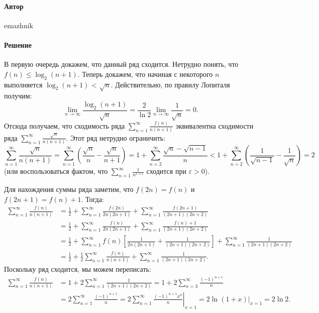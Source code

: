 \documentclass{article}
\begin{document}
\paragraph{Автор} emazhnik
\paragraph{Решение} В первую очередь докажем, что данный ряд сходится. Нетрудно понять, что $f(n) \leq \log_2 (n+1)$.
Теперь докажем, что начиная с некоторого $n$ выполняется $\log_2 (n+1)$ < $\sqrt{n}$. Действительно, по правилу Лопиталя получим:
$$\lim_{n\to \infty} \frac{\log_2 (n+1)}{\sqrt{n}} = \frac{2}{\ln 2} \lim_{n\to \infty} \frac{1}{\sqrt{n}} = 0.$$
Отсюда получаем, что сходимость ряда $\sum\limits_{n=1}^\infty \frac{f(n)}{n(n+1)}$ эквивалентна сходимости ряда $\sum\limits_{n=1}^\infty \frac{\sqrt{n}}{n(n+1)}$.
Этот ряд нетрудно ограничить:
$$\sum_{n=1}^\infty \frac{\sqrt{n}}{n(n+1)} = \sum_{n=1}^\infty \left( \frac{\sqrt{n}}{n} - \frac{\sqrt{n}}{n+1} \right) = 1 + \sum_{n=2}^\infty \frac{\sqrt{n} - \sqrt{n-1}}{n} < 1 + \sum_{n=2}^\infty \left( \frac{1}{\sqrt{n-1}} - \frac{1}{\sqrt{n}} \right) = 2$$
(или воспользоваться фактом, что $\sum_{n=1}^\infty \frac{1}{n^{1+\varepsilon}}$ сходится при $\varepsilon > 0$).

Для нахождения суммы ряда заметим, что $f(2n) = f(n)$ и $f(2n+1) = f(n)+1$. Тогда:
\begin{align*}
\sum\limits_{n=1}^\infty \frac{f(n)}{n(n+1)} &= \frac12 + \sum\limits_{n=1}^\infty \frac{f(2n)}{2n(2n+1)} + \sum\limits_{n=1}^\infty \frac{f(2n+1)}{(2n+1)(2n+2)} \\
&= \frac12 + \sum\limits_{n=1}^\infty \frac{f(n)}{2n(2n+1)} + \sum\limits_{n=1}^\infty \frac{f(n)+1}{(2n+1)(2n+2)} \\
&= \frac12 + \sum\limits_{n=1}^\infty f(n) \left[ \frac{1}{2n(2n+1)} + \frac{1}{(2n+1)(2n+2)} \right] + \sum\limits_{n=1}^\infty \frac{1}{(2n+1)(2n+2)} \\
&= \frac12 + \frac12 \sum\limits_{n=1}^\infty \frac{f(n)}{n(n+1)} + \sum\limits_{n=1}^\infty \frac{1}{(2n+1)(2n+2)}.
\end{align*}
Поскольку ряд сходится, мы можем переписать:
\begin{align*}
\sum\limits_{n=1}^\infty \frac{f(n)}{n(n+1)} &= 1 + 2\sum\limits_{n=1}^\infty \frac{1}{(2n+1)(2n+2)} = 1 + 2\sum_{n=3}^\infty \frac{(-1)^{n+1}}{n} \\
&= 2\sum_{n=1}^\infty \frac{(-1)^{n+1}}{n} = 2 \left. \sum_{n=1}^\infty \frac{(-1)^{n+1}x^n}{n} \right|_{x=1} = 2\ln (1+x) |_{x=1} = 2\ln 2.
\end{align*}
\end{document}
